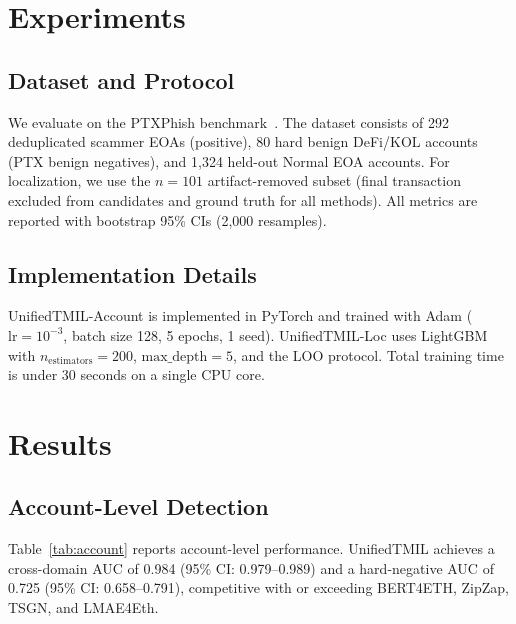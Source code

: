 \documentclass[conference]{IEEEtran}
\newcommand{\ours}{UnifiedTMIL}
\begin{document}
\FloatBarrier

\section{Experiments}\label{sec:experiments}

\subsection{Dataset and Protocol}

We evaluate on the PTXPhish benchmark~\cite{ptxphish}. The dataset consists of 292 deduplicated scammer EOAs (positive), 80 hard benign DeFi/KOL accounts (PTX benign negatives), and 1,324 held-out Normal EOA accounts. For localization, we use the $n{=}101$ artifact-removed subset (final transaction excluded from candidates and ground truth for all methods). All metrics are reported with bootstrap 95\% CIs (2,000 resamples).

\subsection{Implementation Details}

\ours{}-Account is implemented in PyTorch and trained with Adam ($\text{lr}{=}10^{-3}$, batch size 128, 5 epochs, 1 seed). \ours{}-Loc uses LightGBM with $n_{\text{estimators}}{=}200$, $\text{max\_depth}{=}5$, and the LOO protocol. Total training time is under 30 seconds on a single CPU core.

\section{Results}\label{sec:results}

\subsection{Account-Level Detection}

Table~\ref{tab:account} reports account-level performance. \ours{} achieves a cross-domain AUC of 0.984 (95\% CI: 0.979--0.989) and a hard-negative AUC of 0.725 (95\% CI: 0.658--0.791), competitive with or exceeding BERT4ETH, ZipZap, TSGN, and LMAE4Eth.
\end{document}
